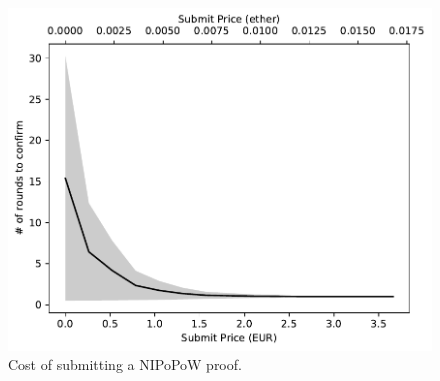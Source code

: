 \begin{figure}[!h]
    \begin{center}
        \includegraphics[width=0.7\columnwidth]{figures/cryptoeconomics-submit.pdf}
    \end{center}
    \caption{Cost of submitting a NIPoPoW proof.}
    \label{fig:cryptoeconomics-submit}
\end{figure}
